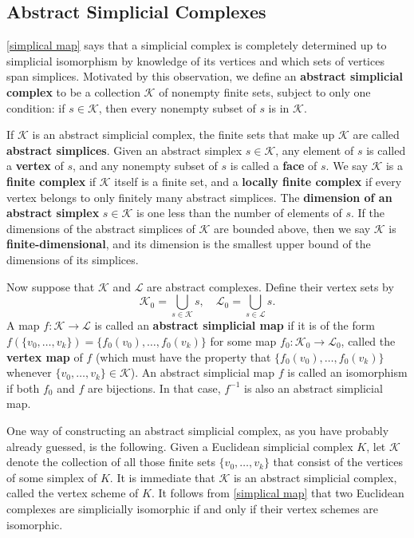 \subsection{Abstract Simplicial Complexes}
\cref{simplical map} says that a simplicial complex is completely determined up to simplicial isomorphism by knowledge of its vertices and which sets of vertices span simplices. Motivated by this observation, we define an \textbf{abstract simplicial complex} to be a collection $\mathcal{K}$ of nonempty finite sets, subject to only one condition: if $s\in\mathcal{K}$, then every nonempty subset of $s$ is in $\mathcal{K}$.\par
If $\mathcal{K}$ is an abstract simplicial complex, the finite sets that make up $\mathcal{K}$ are called \textbf{abstract simplices}. Given an abstract simplex $s\in\mathcal{K}$, any element of $s$ is called a \textbf{vertex} of $s$, and any nonempty subset of $s$ is called a \textbf{face} of $s$. We say $\mathcal{K}$ is a \textbf{finite complex} if $\mathcal{K}$ itself is a finite set, and a \textbf{locally finite complex} if every vertex belongs to only finitely many abstract simplices. The \textbf{dimension of an abstract simplex} $s\in\mathcal{K}$ is one less than the number of elements of $s$. If the dimensions of the abstract simplices of $\mathcal{K}$ are bounded above, then we say $\mathcal{K}$ is \textbf{finite-dimensional}, and its dimension is the smallest upper bound of the dimensions of its simplices.\par
Now suppose that $\mathcal{K}$ and $\mathcal{L}$ are abstract complexes. Define their vertex sets by
\[\mathcal{K}_0=\bigcup_{s\in\mathcal{K}}s,\quad \mathcal{L}_0=\bigcup_{s\in\mathcal{L}}s.\]
A map $f:\mathcal{K}\to\mathcal{L}$ is called an \textbf{abstract simplicial map} if it is of the form $f(\{v_0,\dots,v_k\})=\{f_0(v_0),\dots,f_0(v_k)\}$ for some map $f_0:\mathcal{K}_0\to\mathcal{L}_0$, called the \textbf{vertex map} of $f$ (which must have the property that $\{f_0(v_0),\dots,f_0(v_k)\}$ whenever $\{v_0,\dots,v_k\}\in\mathcal{K}$). An abstract simplicial map $f$ is called an isomorphism if both $f_0$ and $f$ are bijections. In that case, $f^{-1}$ is also an abstract simplicial map.\par
One way of constructing an abstract simplicial complex, as you have probably
already guessed, is the following. Given a Euclidean simplicial complex $K$, let $\mathcal{K}$ denote the collection of all those finite sets $\{v_0,\dots,v_k\}$ that consist of the vertices of some simplex of $K$. It is immediate that $\mathcal{K}$ is an abstract simplicial complex, called the vertex scheme of $K$. It follows from \cref{simplical map} that two Euclidean complexes are simplicially isomorphic if and only if their vertex schemes are isomorphic.
